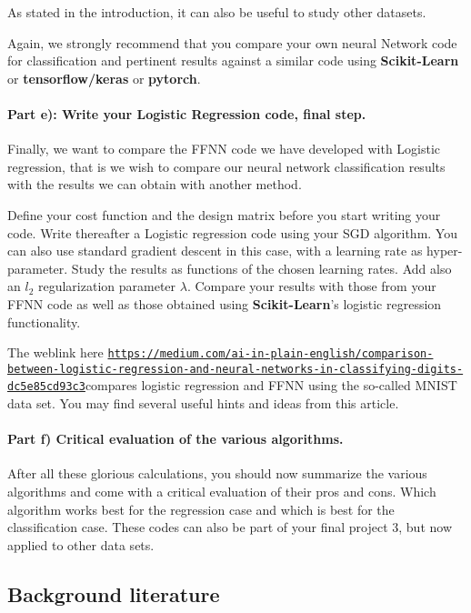 \documentclass[%
oneside,                 %
final,                   %
10pt]{article}
\begin{document}
As stated in the introduction, it can also be useful to study other
datasets. 

Again, we strongly recommend that you compare your own neural Network
code for classification and pertinent results against a similar code using \textbf{Scikit-Learn}  or \textbf{tensorflow/keras} or \textbf{pytorch}.

\paragraph{Part e): Write your Logistic Regression code, final step.}
Finally, we want to compare the FFNN code we have developed with
Logistic regression, that is we wish to compare our neural network
classification results with the results we can obtain with another
method.

Define your cost function and the design matrix before you start writing your code.
Write thereafter a Logistic regression code using your SGD algorithm. You can also use standard gradient descent in this case, with a learning rate as hyper-parameter.
Study the results as functions of the chosen learning rates.
Add also an $l_2$ regularization parameter $\lambda$. Compare your results with those from your FFNN code as well as those obtained using \textbf{Scikit-Learn}'s logistic regression functionality.

The weblink  here \href{{https://medium.com/ai-in-plain-english/comparison-between-logistic-regression-and-neural-networks-in-classifying-digits-dc5e85cd93c3}}{\nolinkurl{https://medium.com/ai-in-plain-english/comparison-between-logistic-regression-and-neural-networks-in-classifying-digits-dc5e85cd93c3}}compares logistic regression and FFNN using the so-called MNIST data set. You may find several useful hints and ideas from this article. 

\paragraph{Part f) Critical evaluation of the various algorithms.}
After all these glorious calculations, you should now summarize the
various algorithms and come with a critical evaluation of their pros
and cons. Which algorithm works best for the regression case and which
is best for the classification case. These codes can also be part of
your final project 3, but now applied to other data sets.

\subsection*{Background literature}
\end{document}
